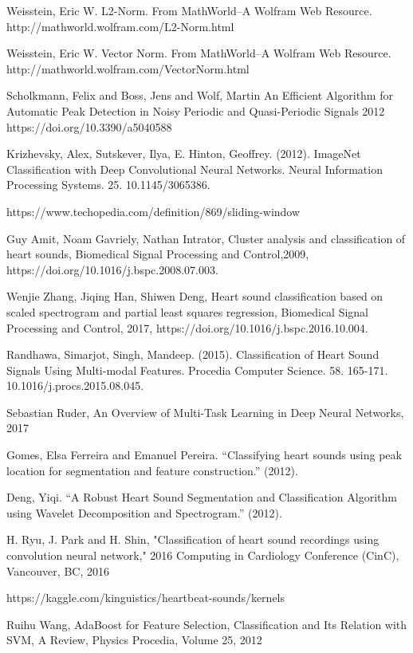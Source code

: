 \documentclass[11pt, a4papper]{report}
\theoremstyle{plain}
\theoremstyle{definition}
\theoremstyle{definition}
\theoremstyle{proposition}
\begin{document}
\begin{thebibliography}{1}
 Weisstein, Eric W. L2-Norm. From MathWorld--A Wolfram Web Resource. http://mathworld.wolfram.com/L2-Norm.html

 Weisstein, Eric W. Vector Norm. From MathWorld--A Wolfram Web Resource. http://mathworld.wolfram.com/VectorNorm.html

 Scholkmann, Felix and Boss, Jens and Wolf, Martin An Efficient Algorithm for Automatic Peak Detection in Noisy Periodic and Quasi-Periodic Signals 2012 https://doi.org/10.3390/a5040588

 Krizhevsky, Alex, Sutskever, Ilya, E. Hinton, Geoffrey. (2012). ImageNet Classification with Deep Convolutional Neural Networks. Neural Information Processing Systems. 25. 10.1145/3065386. 

 https://www.techopedia.com/definition/869/sliding-window

 Guy Amit, Noam Gavriely, Nathan Intrator, Cluster analysis and classification of heart sounds, Biomedical Signal Processing and Control,2009, https://doi.org/10.1016/j.bspc.2008.07.003.

 Wenjie Zhang, Jiqing Han, Shiwen Deng, Heart sound classification based on scaled spectrogram and partial least squares regression, Biomedical Signal Processing and Control, 2017, https://doi.org/10.1016/j.bspc.2016.10.004.

 Randhawa, Simarjot, Singh, Mandeep. (2015). Classification of Heart Sound Signals Using Multi-modal Features. Procedia Computer Science. 58. 165-171. 10.1016/j.procs.2015.08.045. 

 Sebastian Ruder, An Overview of Multi-Task Learning in Deep Neural Networks, 2017

 Gomes, Elsa Ferreira and Emanuel Pereira. “Classifying heart sounds using peak location for segmentation and feature construction.” (2012).

 Deng, Yiqi. “A Robust Heart Sound Segmentation and Classification Algorithm using Wavelet Decomposition and Spectrogram.” (2012).

 H. Ryu, J. Park and H. Shin, "Classification of heart sound recordings using convolution neural network," 2016 Computing in Cardiology Conference (CinC), Vancouver, BC, 2016

 https://kaggle.com/kinguistics/heartbeat-sounds/kernels

 Ruihu Wang, AdaBoost for Feature Selection, Classification and Its Relation with SVM, A Review, Physics Procedia, Volume 25, 2012

\end{thebibliography}

\end{document}
